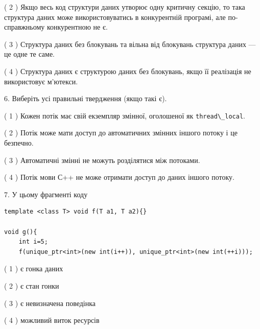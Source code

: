 \documentclass[12pt, ukrainian]{article}
\def\code#1{\Verb!#1!}
\begin{document}
\begin {large}
{( 2 ) Якщо весь код структури даних утворює одну критичну секцію, то така структура даних може використовуватись в конкурентній програмі, але по-справжньо\-му конкурентною не є.%

( 3 ) Структура даних без блокувань та вільна від блокувань структура даних --- це одне те саме.%

( 4 ) Структура даних є структурою даних без блокувань, якщо її реалізація не використовує м’ютекси.%
\newpage



\vspace{5mm}
6. Виберіть усі правильні твердження (якщо такі є).\par
\vspace{2mm}

( 1 ) Кожен потік має свій екземпляр змінної, оголошеної як \code{thread\_local}.%

( 2 ) Потік може мати доступ до автоматичних змінних іншого потоку і це безпечно.%

( 3 ) Автоматичні змінні не можуть розділятися між потоками.%

( 4 ) Потік мови С++ не може отримати доступ до даних іншого потоку.%


\vspace{5mm}
7. У цьому фрагменті коду
\begin{verbatim}
template <class T> void f(T a1, T a2){}

void g(){
    int i=5;
    f(unique_ptr<int>(new int(i++)), unique_ptr<int>(new int(++i)));
\end{verbatim}

( 1 ) є гонка даних%

( 2 ) є стан гонки%

( 3 ) є невизначена поведінка%

( 4 ) можливий виток ресурсів%
}
\end {large}
\end{document}
